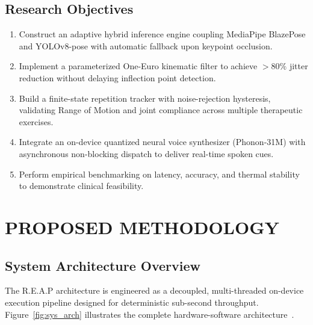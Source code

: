 \documentclass[12pt]{report}
\begin{document}
\section{Research Objectives}
\begin{enumerate}[label=\arabic*., leftmargin=*]
    \item Construct an adaptive hybrid inference engine coupling MediaPipe BlazePose and YOLOv8-pose with automatic fallback upon keypoint occlusion.
    \item Implement a parameterized One-Euro kinematic filter to achieve $>80\%$ jitter reduction without delaying inflection point detection.
    \item Build a finite-state repetition tracker with noise-rejection hysteresis, validating Range of Motion and joint compliance across multiple therapeutic exercises.
    \item Integrate an on-device quantized neural voice synthesizer (Phonon-31M) with asynchronous non-blocking dispatch to deliver real-time spoken cues.
    \item Perform empirical benchmarking on latency, accuracy, and thermal stability to demonstrate clinical feasibility.
\end{enumerate}

\chapter{PROPOSED METHODOLOGY}

\section{System Architecture Overview}
The R.E.A.P architecture is engineered as a decoupled, multi-threaded on-device execution pipeline designed for deterministic sub-second throughput. Figure~\ref{fig:sys_arch} illustrates the complete hardware-software architecture~\cite{lugaresi2019mediapipe, maji2022yolopose}.
\end{document}
